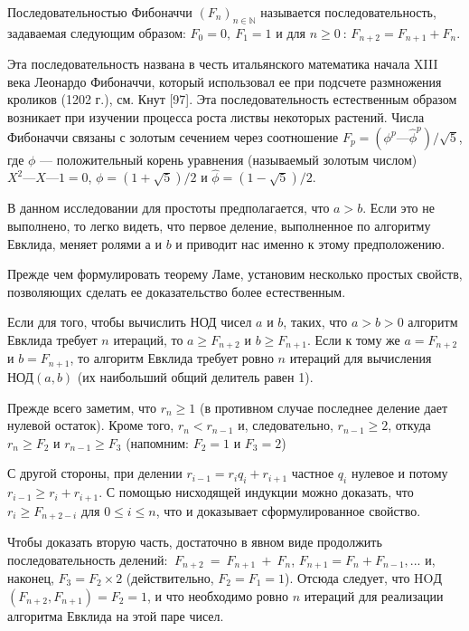 \begin{determ}
\hspace*{15pt}Последовательностью Фибоначчи $(F_n)_{n \in \mathbb{N}}$ называется  
последовательность, задаваемая следующим образом: $F_0 = 0,\: F_1 = 1$ и для $n \geqslant 0\:$:
$F_{n+2} = F_{n+1} + F_n$.
\end{determ}

\begin{mynotice} 
Эта последовательность названа в честь  
итальянского математика начала XIII века Леонардо Фибоначчи,  
который использовал ее при подсчете размножения кроликов (1202 г.), 
см. Кнут [97]. Эта последовательность естественным образом  
возникает при изучении процесса роста листвы некоторых растений. 
Числа Фибоначчи связаны с золотым сечением через  
соотношение $F_p = (\phi^p — \hat{\phi}^p)\slash \sqrt{5}$, где $\phi$ — положительный корень уравнения 
(называемый золотым числом) $X^2 — X — 1 = 0$, $\phi = (1 + \sqrt{5})\slash 2$ и 
$\hat{\phi} = (1 - \sqrt{5})\slash 2$.\newline 
\end{mynotice}

В данном исследовании для простоты предполагается, что $a > b$. 
Если это не выполнено, то легко видеть, что первое деление,  
выполненное по алгоритму Евклида, меняет ролями $а$ и $b$ и приводит нас именно 
к этому предположению.
 
Прежде чем формулировать теорему Ламе, установим несколько 
простых свойств, позволяющих сделать ее доказательство более  
естественным. 

\begin{property}
\hspace*{15pt}Если для того, чтобы вычислить $\text{НОД}$ чисел $a$ и $b$, таких, что 
$a > b > 0$ алгоритм Евклида требует $n$ итераций, то $a \geqslant F_{n+2}$ и 
$b \geqslant F_{n+1}$. Если к тому же $a = F_{n+2}$ и $b = F_{n+1}$, то алгоритм Евклида 
требует ровно $n$ итераций для вычисления $\text{НОД}(a, b)$ (их наибольший 
общий делитель равен 1). 
\end{property}

\begin{myproof}
Прежде всего заметим, что $r_n \geqslant 1$ (в противном случае последнее 
деление дает нулевой остаток). Кроме того, $r_n < r_{n-1}$ и,  
следовательно, $r_{n-1} \geqslant 2$, откуда $r_n \geqslant F_2$ и $r_{n-1} \geqslant F_3$ (напомним: $F_2 = 1$ и 
$F_3 = 2$)

\noindent С другой стороны, при делении $r_{i-1} = r_i q_i + r_{i + 1}$  частное $q_i$ нулевое 
и потому $r_{i-1} \geqslant r_i + r_{i+1}$. С помощью нисходящей индукции можно 
доказать, что $r_i \geqslant F_{n+2-i}$ для $0 \leqslant i \leqslant n$, что и доказывает  
сформулированное свойство.
 
\noindent Чтобы доказать вторую часть, достаточно в явном виде  
продолжить последовательность делений: $\: F_{n+2}\: = \: F_{n+1}\: + \: F_n$, 
$F_{n+1} = F_n + F_{n-1}, ...$ и, наконец, $F_3 = F_2 \times 2$ (действительно, 
$F_2 = F_1 = 1$). Отсюда следует, что HOД$(F_{n+2}, F_{n+1}) = F_2 = 1$, и 
что необходимо ровно $n$ итераций для реализации алгоритма Евклида
 на этой паре чисел.
\end{myproof} 

